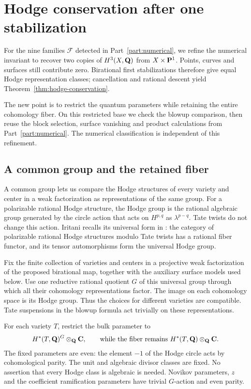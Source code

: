 \section{Hodge conservation after one stabilization}\label{sec:hodge-conservation}

For the nine families $\mathcal F$ detected in Part~\ref{part:numerical},
we refine the numerical invariant to recover two copies of $H^3(X,\mathbf Q)$
from $X\times\mathbf P^1$. Points, curves and surfaces still contribute zero.
Birational first stabilizations therefore give equal Hodge representation
classes; cancellation and rational descent yield
Theorem~\ref{thm:hodge-conservation}.

The new point is to restrict the quantum parameters while retaining the
entire cohomology fiber. On this restricted base we check the blowup
comparison, then reuse the block selection, surface vanishing and product
calculations from Part~\ref{part:numerical}. The numerical classification
is independent of this refinement.

\subsection{A common group and the retained fiber}

A common group lets us compare the Hodge structures of every variety and
center in a weak factorization as representations of the same group.
For a polarizable rational Hodge structure, the Hodge group is the rational
algebraic group generated by the circle action that acts on $H^{p,q}$ as
$\lambda^{p-q}$. Tate twists do not change this action. Iritani recalls
its universal form in \cite[Section~3]{IritaniHodge}: the category of polarizable
rational Hodge structures modulo Tate twists has a rational fiber functor,
and its tensor automorphisms form the universal Hodge group.

Fix the finite collection of varieties and centers in a projective weak
factorization of the proposed birational map, together with the auxiliary
surface models used below. Use one reductive rational
quotient $G$ of this universal group through which all their cohomology
representations factor. The image on each cohomology space is its Hodge
group. Thus the choices for different varieties are compatible. Tate
suspensions in the blowup formula act trivially on these representations.

For each variety $T$, restrict the bulk parameter to
\[
 H^*(T,\mathbf Q)^G\otimes_\mathbf Q\mathbf C,
 \qquad\text{while the fiber remains }H^*(T,\mathbf Q)\otimes_\mathbf Q\mathbf C.
\]
The fixed parameters are even: the element $-1$ of the Hodge circle acts
by cohomological parity. The unit and algebraic divisor classes are fixed.
No assertion that every Hodge class is algebraic is needed. Novikov
parameters, $z$ and the coefficient ramification parameters have trivial
$G$-action and even parity.

